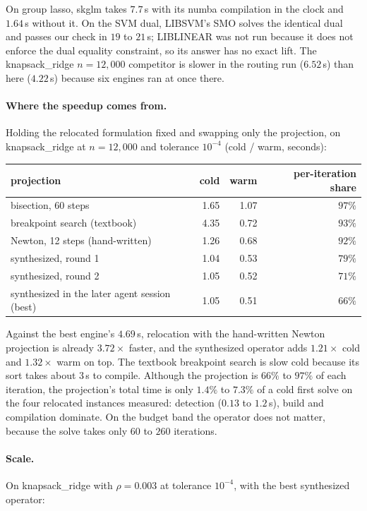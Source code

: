 \documentclass[11pt]{article}
\begin{document}
On group lasso, skglm takes $7.7$\,s with its numba compilation in the clock and
$1.64$\,s without it. On the SVM dual, LIBSVM's SMO solves the identical dual and
passes our check in $19$ to $21$\,s; LIBLINEAR was not run because it does not
enforce the dual equality constraint, so its answer has no exact lift. The
knapsack\_ridge $n = 12{,}000$ competitor is slower in the routing run
($6.52$\,s) than here ($4.22$\,s) because six engines ran at once there.

\paragraph{Where the speedup comes from.}
Holding the relocated formulation fixed and swapping only the projection, on
knapsack\_ridge at $n = 12{,}000$ and tolerance $10^{-4}$ (cold / warm, seconds):

\begin{center}
\small
\begin{tabular}{lrrr}
\toprule
projection & cold & warm & per-iteration share \\
\midrule
bisection, 60 steps & 1.65 & 1.07 & $97\%$ \\
breakpoint search (textbook) & 4.35 & 0.72 & $93\%$ \\
Newton, 12 steps (hand-written) & 1.26 & 0.68 & $92\%$ \\
synthesized, round 1 & 1.04 & 0.53 & $79\%$ \\
synthesized, round 2 & 1.05 & 0.52 & $71\%$ \\
synthesized in the later agent session (best) & 1.05 & 0.51 & $66\%$ \\
\bottomrule
\end{tabular}
\end{center}

Against the best engine's $4.69$\,s, relocation with the hand-written Newton
projection is already $3.72\times$ faster, and the synthesized operator adds
$1.21\times$ cold and $1.32\times$ warm on top. The textbook breakpoint search is
slow cold because its sort takes about $3$\,s to compile. Although the
projection is $66\%$ to $97\%$ of each iteration, the projection's total time is
only $1.4\%$ to $7.3\%$ of a cold first solve on the four relocated instances
measured:
detection ($0.13$ to $1.2$\,s), build and compilation dominate. On the budget
band the operator does not matter, because the solve takes only $60$ to $260$
iterations.

\paragraph{Scale.}
On knapsack\_ridge with $\rho = 0.003$ at tolerance $10^{-4}$, with the best
synthesized operator:
\end{document}
